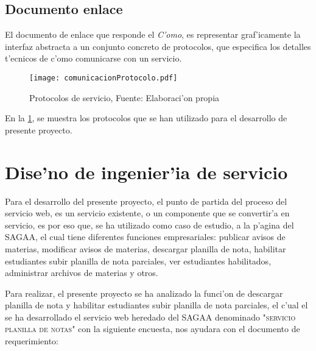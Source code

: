 \subsection{Documento enlace}
El documento de enlace que responde el \textsl{C'omo}, es representar graf'icamente la interfaz abstracta a un conjunto concreto de protocolos, que especifica los detalles t'ecnicos de c'omo comunicarse con un servicio.
\begin{figure}
\centering
\texttt{[image: comunicacionProtocolo.pdf]}
\captionsetup{justification=centering, margin=2cm}
\caption{Protocolos de servicio, Fuente: Elaboraci'on propia}
\label{fig:Comunicacion}
\end{figure}

En la \ref{fig:Comunicacion}, se muestra los protocolos que se han utilizado para el desarrollo de presente proyecto.

\section{Dise'no de ingenier'ia de servicio}
Para el desarrollo del presente proyecto, el punto de partida del proceso del servicio web, es un servicio existente, o un componente que se convertir'a en servicio, es por eso que, se ha utilizado como caso de estudio, a la p'agina del SAGAA, el cual tiene  diferentes funciones empresariales: publicar avisos de materias, modificar avisos de materias,  descargar planilla de nota, habilitar estudiantes subir planilla de nota parciales, ver estudiantes habilitados, administrar archivos de materias y otros.
  
Para realizar, el presente proyecto se ha analizado la funci'on de descargar planilla de nota y habilitar estudiantes subir planilla de nota parciales, el c'ual el se ha desarrollado el servicio web heredado del SAGAA denominado \textsc{"servicio planilla de notas"} con la siguiente encuesta, nos ayudara con el documento de requerimiento:

